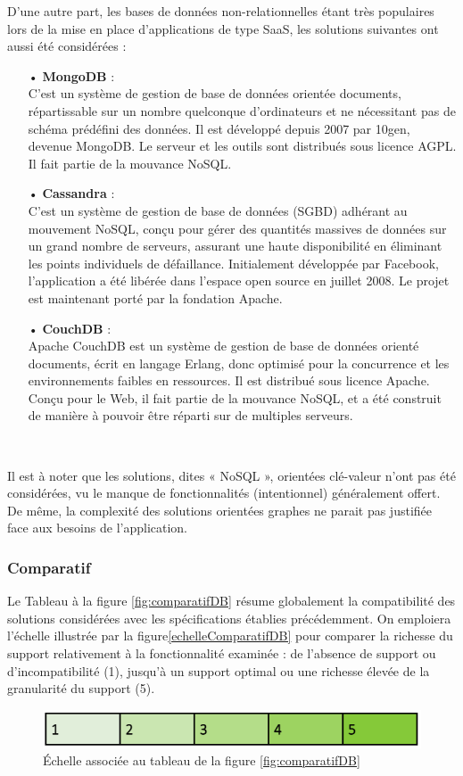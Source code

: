 \begin{spacing}{1.5}
D’une autre part, les bases de données non-relationnelles étant très populaires lors de la mise en place d’applications de type SaaS, les solutions suivantes ont aussi été considérées :
\begin{itemize}
    \item[•] \textbf{MongoDB} :\\
C’est un système de gestion de base de données orientée documents, répartissable sur un nombre quelconque d'ordinateurs et ne nécessitant pas de schéma prédéfini des données. Il est développé depuis 2007 par 10gen, devenue MongoDB. Le serveur et les outils sont distribués sous licence AGPL. Il fait partie de la mouvance NoSQL.
    \item[•] \textbf{Cassandra} :\\
C’est un système de gestion de base de données (SGBD) adhérant au mouvement NoSQL, conçu pour gérer des quantités massives de données sur un grand nombre de serveurs, assurant une haute disponibilité en éliminant les points individuels de défaillance. Initialement développée par Facebook, l'application a été libérée dans l'espace open source en juillet 2008. Le projet est maintenant porté par la fondation Apache.
    \item[•] \textbf{CouchDB} :\\
Apache CouchDB est un système de gestion de base de données orienté documents, écrit en langage Erlang, donc optimisé pour la concurrence et les environnements faibles en ressources. Il est distribué sous licence Apache. Conçu pour le Web, il fait partie de la mouvance NoSQL, et a été construit de manière à pouvoir être réparti sur de multiples serveurs.
\end{itemize}
\

Il est à noter que les solutions, dites « NoSQL », orientées clé-valeur n’ont pas été considérées, vu le manque de fonctionnalités (intentionnel) généralement offert. De même, la complexité des solutions orientées graphes ne parait pas justifiée face aux besoins de l’application.

\subsubsection{Comparatif}%
Le Tableau à la figure \ref{fig:comparatifDB} résume globalement la compatibilité des solutions considérées avec les spécifications établies précédemment.
On emploiera l’échelle illustrée par la figure\ref{echelleComparatifDB} pour comparer la richesse du support relativement à la fonctionnalité examinée :  de l’absence de support ou d’incompatibilité (1), jusqu’à un support optimal ou une richesse élevée de la granularité du support (5).
\begin{figure}[h]
\centering
\includegraphics[width=0.5\linewidth]{echelleComparatifDB.png}
\caption{Échelle associée au tableau de la figure \ref{fig:comparatifDB}}
\label{fig:echelleComparatifDB}
\end{figure}
\


\end{spacing}
